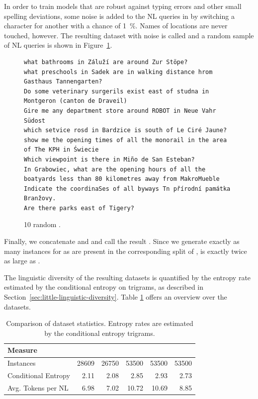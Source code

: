 In order to train models that are robust against typing errors and other small
spelling deviations, some noise is added to the NL queries in
\nlmapsthreea{} by switching a character for another with a chance of
\SI{1}{\%}. Names of locations are never touched, however. The resulting dataset
with noise is called \nlmapsthreeb{} and a random sample of NL queries is
shown in Figure~\ref{fig:nlmaps-v3b-sample}.

\begin{figure}[h]
  \centering
\begin{lstlisting}[style=MyNL]
what bathrooms in Záluží are around Zur Stöpe?
what preschools in Sadek are in walking distance hrom Gasthaus Tannengarten?
Do some veterinary surgerils exist east of studna in Montgeron (canton de Draveil)
Gire me any department store around ROBOT in Neue Vahr Südost
which setvice rosd in Bardzice is south of Le Ciré Jaune?
show me the opening times of all the monorail in the area of The KPH in Świecie
Which viewpoint is there in Miño de San Esteban?
In Grabowiec, what are the opening hours of all the boatyards less than 80 kilometres away from MakroMueble
Indicate the coordinaSes of all byways Tn přírodní památka Branžovy.
Are there parks east of Tigery?
\end{lstlisting}
  \caption[10 random \nlmapsthreeb{}.]{10 random \nlmapsthreeb{}.}
  \label{fig:nlmaps-v3b-sample}
\end{figure}

Finally, we concatenate \nlmapstwo{} and \nlmapsthreeb{} and call the result
\nlmapsthree{}. Since we generate exactly as many instances for
\nlmapsthreeb{} as are present in the corresponding split of \nlmapstwoone{},
\nlmapsthree{} is exactly twice as large as \nlmapstwoone{}.

The linguistic diversity of the resulting datasets is quantified by the entropy
rate estimated by the conditional entropy on trigrams, as described in
Section~\ref{sec:little-linguistic-diversity}. Table \ref{tab:v2-v3-overview}
offers an overview over the datasets.

\begin{table}[h]
  \centering
  \begin{tabular}{lrrrrr}
    \toprule
    Measure & \nlmtwo{} & \nlmtwoone{} & \nlmthreea{} & \nlmthreeb{} & \nlmthree{}\\
    \midrule
    Instances & \num{28609} & \num{26750} & \num{53500} & \num{53500} & \num{53500}\\
    Conditional Entropy & \num{2.11} & \num{2.08} & \num{2.85} & \num{2.93} & \num{2.73}\\
    Avg. Tokens per NL & \num{6.98} & \num{7.02} & \num{10.72} & \num{10.69} & \num{8.85}\\
    \bottomrule
  \end{tabular}
  \caption[Dataset statistics]{Comparison of dataset statistics. Entropy rates
    are estimated by the conditional entropy trigrams.}
  \label{tab:v2-v3-overview}
\end{table}

